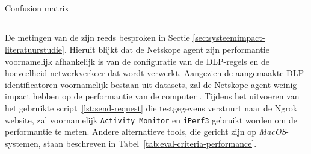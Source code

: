 \subsection{}
\label{sec:correctheid}

Confusion matrix

\subsection{}
\label{sec:eva-performantie}



De metingen van de zijn reeds besproken in Sectie \ref{sec:systeemimpact-literatuurstudie}.
Hieruit blijkt dat de Netskope agent zijn performantie voornamelijk afhankelijk is van de configuratie van de DLP-regels en de hoeveelheid netwerkverkeer dat wordt verwerkt.
Aangezien de aangemaakte DLP-identificatoren voornamelijk bestaan uit datasets, zal de Netskope agent weinig impact hebben op de performantie van de computer \autocite{Netskope2025Utilization}.
Tijdens het uitvoeren van het gebruikte script~\ref{lst:send-request} die testgegevens verstuurt naar de Ngrok website, zal voornamelijk \texttt{Activity Monitor} en \texttt{iPerf3} gebruikt worden om de performantie te meten.
Andere alternatieve tools, die gericht zijn op \textit{MacOS}-systemen, staan beschreven in Tabel~\ref{tab:eval-criteria-performance}.






\subsubsection{}
\label{sec:testscenario's}

